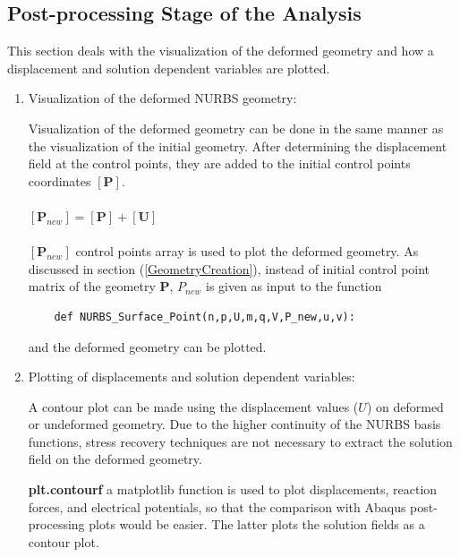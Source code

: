 \documentclass[11pt]{article}
\begin{document}
\subsection{Post-processing Stage of the Analysis}
This section deals with the visualization of the deformed geometry and how a
displacement and solution dependent variables are plotted. 

\begin{enumerate}[leftmargin=*]
	\item Visualization of the deformed NURBS geometry:	
	
	Visualization of the deformed geometry can be done in the same manner as the visualization of the initial geometry. After determining the displacement field at the control points, they are added to the initial control points coordinates
	$[\textbf{P}]$.\\
	\\
	$[\textbf{P}_{new}]=[\textbf{P}]+[\textbf{U}]$ \\
	\\
	$[\textbf{P}_{new}]$ control points array is used to plot the deformed
	geometry.
	As discussed in section (\ref{GeometryCreation}), instead of initial control point matrix of the geometry \textbf{P}, \textbf{$P_{new}$} is given as input to the function 
	\begin{verbatim}
	def NURBS_Surface_Point(n,p,U,m,q,V,P_new,u,v):
	\end{verbatim}
	and the deformed geometry can be plotted.
	 
	
	\item Plotting of displacements and solution dependent variables:
	
	A contour plot can be made using the displacement values ($U$) on deformed or undeformed geometry.
	Due to the higher continuity of the NURBS basis functions, stress recovery techniques are not necessary to extract the solution field on the deformed geometry.  
	
	\textbf{plt.contourf} a matplotlib function is used to plot displacements, reaction forces, and electrical potentials, so that the comparison with Abaqus post-processing plots would be easier. The latter plots the solution fields as a contour plot.
	
\end{enumerate}
\end{document}
